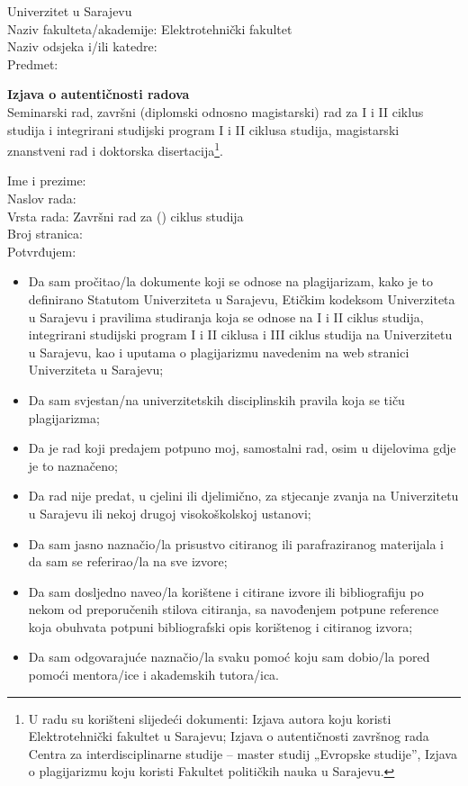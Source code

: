 {\scriptsize 

\noindent Univerzitet u Sarajevu \\
Naziv fakulteta/akademije: Elektrotehnički fakultet \\
Naziv odsjeka i/ili katedre: \odsjek \\
Predmet: \predmet \\


\begin{center}
	\textbf{Izjava o autentičnosti radova} \\
	\vskip 2mm 
	Seminarski rad, završni (diplomski odnosno magistarski) rad za I i II ciklus studija i integrirani
	studijski program I i II ciklusa studija, magistarski znanstveni rad i doktorska disertacija\footnote{\scriptsize U radu su korišteni slijedeći dokumenti: Izjava autora koju koristi Elektrotehnički fakultet u Sarajevu; Izjava o
		autentičnosti završnog rada Centra za interdisciplinarne studije – master studij „Evropske studije”, Izjava o
		plagijarizmu koju koristi Fakultet političkih nauka u Sarajevu.}.
\end{center} 
\noindent Ime i prezime: \imePrezime \\
Naslov rada: \naslovTeze \\
Vrsta rada: Završni rad za \ciklus (\ciklusNaziv) ciklus studija \\
Broj stranica: \brojStranica \\ 
\vskip 1mm
Potvrđujem:
\begin{itemize}
	\itemsep 0mm
	\item Da sam pročitao/la dokumente koji se odnose na plagijarizam, kako je to definirano
	Statutom Univerziteta u Sarajevu, Etičkim kodeksom Univerziteta u Sarajevu i pravilima
	studiranja koja se odnose na I i II ciklus studija, integrirani studijski program I i II ciklusa i
	III ciklus studija na Univerzitetu u Sarajevu, kao i uputama o plagijarizmu navedenim na
	web stranici Univerziteta u Sarajevu;
	\item Da sam svjestan/na univerzitetskih disciplinskih pravila koja se tiču plagijarizma;
	\item Da je rad koji predajem potpuno moj, samostalni rad, osim u dijelovima gdje je to
	naznačeno;
	\item Da rad nije predat, u cjelini ili djelimično, za stjecanje zvanja na Univerzitetu u Sarajevu
	ili nekoj drugoj visokoškolskoj ustanovi;
	\item Da sam jasno naznačio/la prisustvo citiranog ili parafraziranog materijala i da sam se
	referirao/la na sve izvore;
	\item Da sam dosljedno naveo/la korištene i citirane izvore ili bibliografiju po nekom od
	preporučenih stilova citiranja, sa navođenjem potpune reference koja obuhvata potpuni
	bibliografski opis korištenog i citiranog izvora;
	\item Da sam odgovarajuće naznačio/la svaku pomoć koju sam dobio/la pored pomoći
	mentora/ice i akademskih tutora/ica. 
\end{itemize}

}
